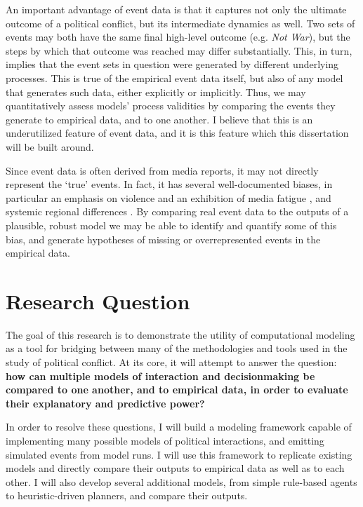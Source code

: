 An important advantage of event data is that it captures not only the ultimate outcome of a political conflict, but its intermediate dynamics as well. Two sets of events may both have the same final high-level outcome (e.g. \emph{Not War}), but the steps by which that outcome was reached may differ substantially. This, in turn, implies that the event sets in question were generated by different underlying processes. This is true of the empirical event data itself, but also of any model that generates such data, either explicitly or implicitly. Thus, we may quantitatively assess models' process validities by comparing the events they generate to empirical data, and to one another. I believe that this is an underutilized feature of event data, and it is this feature which this dissertation will be built around.

Since event data is often derived from media reports, it may not directly represent the `true' events. In fact, it has several well-documented biases, in particular an emphasis on violence and an exhibition of media fatigue \citep{gerner_1998}, and systemic regional differences \citep{schrodt_2001b}. By comparing real event data to the outputs of a plausible, robust model we may be able to identify and quantify some of this bias, and generate hypotheses of missing or overrepresented events in the empirical data.

\section{Research Question}\label{research-question}

The goal of this research is to demonstrate the utility of computational modeling as a tool for bridging between many of the methodologies and tools used in the study of political conflict. At its core, it will attempt to answer the question: \textbf{how can multiple models of interaction and decisionmaking be compared to one another, and to empirical data, in order to evaluate their explanatory and predictive power?}

In order to resolve these questions, I will build a modeling framework capable of implementing many possible models of political interactions, and emitting simulated events from model runs. I will use this framework to replicate existing models and directly compare their outputs to empirical data as well as to each other. I will also develop several additional models, from simple rule-based agents to heuristic-driven planners, and compare their outputs.

